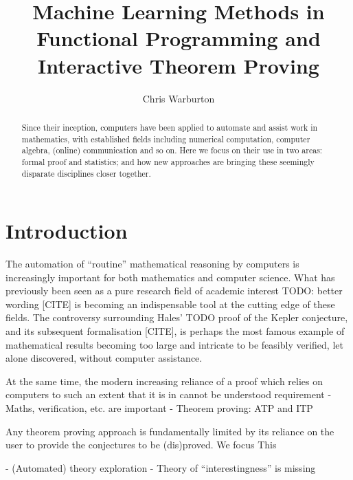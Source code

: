 \documentclass[]{article}
\begin{document}
\pagestyle{headings}  %

\title{Machine Learning Methods in Functional Programming and Interactive Theorem Proving}

\author{Chris Warburton}


\maketitle              %

\begin{abstract}
Since their inception, computers have been applied to automate and assist work in mathematics, with established fields including numerical computation, computer algebra, (online) communication and so on. Here we focus on their use in two areas: formal proof and statistics; and how new approaches are bringing these seemingly disparate disciplines closer together.
\end{abstract}

\section{Introduction}

The automation of ``routine'' mathematical reasoning by computers is increasingly important for both mathematics and computer science. What has previously been seen as a pure research field of academic interest TODO: better wording [CITE] is becoming an indispensable tool at the cutting edge of these fields. The controversy surrounding Hales' TODO proof of the Kepler conjecture, and its subsequent formalisation [CITE], is perhaps the most famous example of mathematical results becoming too large and intricate to be feasibly verified, let alone discovered, without computer assistance.

At the same time, the modern increasing reliance of a proof which relies on computers to such an extent that it is in cannot be understood  requirement
 - Maths, verification, etc. are important
 - Theorem proving: ATP and ITP

Any theorem proving approach is fundamentally limited by its reliance on the user to provide the conjectures to be (dis)proved. We focus This

 - (Automated) theory exploration
 - Theory of ``interestingness'' is missing
\end{document}
